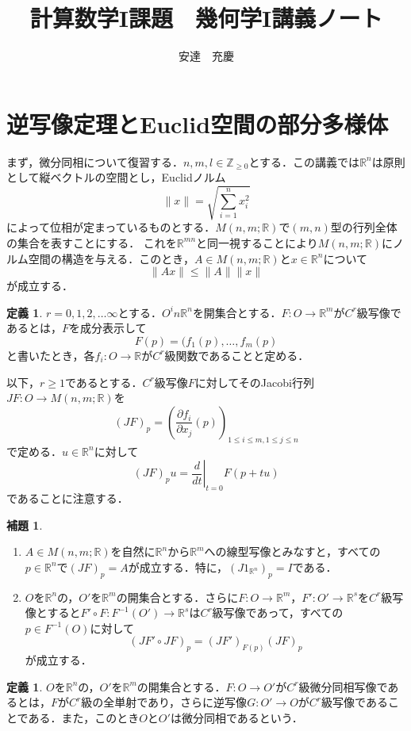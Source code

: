 ﻿\documentclass{jsarticle}
\theoremstyle{definition}
\newtheorem{definition}[theorem]{定義}
\newtheorem{lemma}[theorem]{補題}
\newcommand{\euclid}[1]{\mathbb{R}^{#1}}
\begin{document}
\title{計算数学I課題　幾何学I講義ノート}
\author{安達　充慶}
\date{}
\maketitle

\section{逆写像定理とEuclid空間の部分多様体}
まず，微分同相について復習する．$n,m,l \in \mathbb{Z}_{\geq 0}$とする．この講義では$\mathbb{R}^n$は原則として縦ベクトルの空間とし，Euclidノルム
\[ \| x\|=\sqrt{\sum_{i=1}^n x_i^2} \]
によって位相が定まっているものとする．$M(n,m;\mathbb{R})$で$(m,n)$型の行列全体の集合を表すことにする．
これを$\mathbb{R}^{mn}$と同一視することにより$M(n,m;\mathbb{R})$にノルム空間の構造を与える．このとき，$A\in M(n,m;\mathbb{R})$と$x\in \mathbb{R}^n$について
\[ \| Ax\| \leq \| A\|\| x\| \]
が成立する．

\begin{definition}
$r=0,1,2,\dots \infty$とする．$O^in \mathbb{R}^n$を開集合とする．$F\colon O \to \mathbb{R}^m$が$C^r$級写像であるとは，$F$を成分表示して
\[ F(p)=(f_1(p),\dots,f_m(p) \]
と書いたとき，各$f_i\colon O\to \mathbb{R}$が$C^r$級関数であることと定める．
\end{definition}
以下，$r\geq 1$であるとする．$C^r$級写像$F$に対してそのJacobi行列$JF\colon O\to M(n,m;\mathbb{R})$を
\[ (JF)_p=(\frac{\partial f_i}{\partial x_j}(p))_{1\leq i\leq m,1\leq j\leq n} \]
で定める．$u\in \mathbb{R}^n$に対して
\[ (JF)_p u=\left.{\frac{d}{dt}}\right|_{t=0} F(p+tu) \]
であることに注意する．

\begin{lemma}\label{chain}
\begin{enumerate}[label=(\arabic*)]
\item $A\in M(n,m;\mathbb{R})$を自然に$\mathbb{R}^n$から$\mathbb{R}^m$への線型写像とみなすと，すべての$p\in \euclid{n}$で$(JF)_p=A$が成立する．特に，$(J1_{\euclid{n}})_p=I$である．
\item $O$を$\euclid{n}$の，$O'$を$\euclid{m}$の開集合とする．さらに$F\colon O\to \euclid{m}$，$F'\colon O'\to \euclid{s}$を$C^r$級写像とすると$F'\circ F\colon F^{-1}(O')\to \euclid{s}$は$C^r$級写像であって，すべての$p\in F^{-1}(O)$に対して
\[ (JF'\circ JF)_p=(JF')_{F(p)}(JF)_p \]
が成立する．
\end{enumerate}
\end{lemma}

\begin{definition}\label{diffeo}
$O$を$\euclid{n}$の，$O'$を$\euclid{m}$の開集合とする．$F\colon O\to O'$が$C^r$級微分同相写像であるとは，$F$が$C^r$級の全単射であり，さらに逆写像$G\colon O'\to O$が$C^r$級写像であることである．また，このとき$O$と$O'$は微分同相であるという．
\end{definition}
\end{document}
